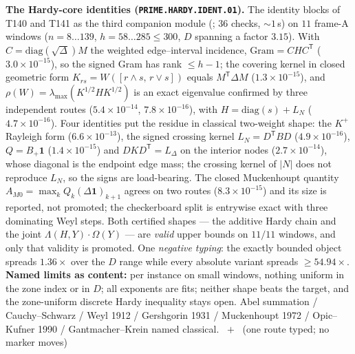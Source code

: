 \documentclass[11pt,a4paper]{article}
\theoremstyle{definition}
\begin{document}
\par\smallskip\noindent\textbf{The Hardy-core identities
(\texttt{PRIME.HARDY.IDENT.01}).}
The identity blocks of T140 and T141 as the third companion module
(; $36$ checks, ${\sim}1$\,s) on $11$ frame-A
windows ($n=8\ldots139$, $h=58\ldots285\le300$, $D$ spanning a factor $3.15$).
With $C=\mathrm{diag}(\sqrt\Delta)M$ the weighted edge--interval incidence,
$\mathrm{Gram}=CHC^{\mathsf T}$ ($3.0\times10^{-15}$), so the signed Gram has rank
$\le h-1$; the covering kernel in closed geometric form
$K_{rs}=W([r\wedge s,\,r\vee s])$ equals $M^{\mathsf T}\Delta M$
($1.3\times10^{-15}$), and $\rho(W)=\lambda_{\max}(K^{1/2}HK^{1/2})$ is an exact
eigenvalue confirmed by three independent routes ($5.4\times10^{-14}$,
$7.8\times10^{-16}$), with $H=\mathrm{diag}(s)+L_N$ ($4.7\times10^{-16}$). Four
identities put the residue in classical two-weight shape: the $K^{+}$ Rayleigh
form ($6.6\times10^{-13}$), the signed crossing kernel $L_N=D^{\mathsf T}BD$
($4.9\times10^{-16}$), $Q=B_+\mathbf 1$ ($1.4\times10^{-15}$) and
$DKD^{\mathsf T}=L_\Delta$ on the interior nodes ($2.7\times10^{-14}$), whose
diagonal is the endpoint edge mass; the crossing kernel of $|N|$ does not
reproduce $L_N$, so the signs are load-bearing. The closed Muckenhoupt quantity
$A_{M0}=\max_kQ_k(\Delta\mathbf 1)_{k+1}$ agrees on two routes
($8.3\times10^{-15}$) and its size is reported, not promoted; the checkerboard
split is entrywise exact with three dominating Weyl steps. Both certified shapes
--- the additive Hardy chain and the joint $\Lambda(H,Y)\cdot\Omega(Y)$ --- are
\emph{valid} upper bounds on $11/11$ windows, and only that validity is promoted.
One \emph{negative typing}: the exactly bounded object spreads $1.36\times$ over
the $D$ range while every absolute variant spreads $\ge54.94\times$.
\textbf{Named limits as content:} per instance on small windows, nothing uniform
in the zone index or in $D$; all exponents are fits; neither shape beats the
target, and the zone-uniform discrete Hardy inequality stays open.
Abel summation / Cauchy--Schwarz / Weyl 1912 / Gershgorin 1931 / Muckenhoupt 1972
/ Opic--Kufner 1990 / Gantmacher--Krein named classical.
\mE\ $+$ \mX\ (one route typed; no marker moves)
\par\smallskip
\end{document}
